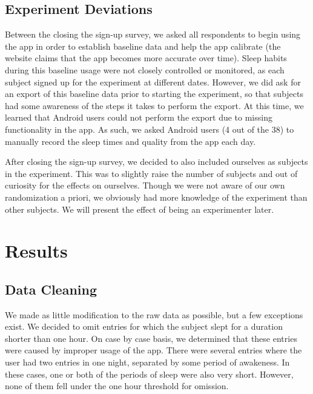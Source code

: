 \documentclass[12pt,]{article}
\begin{document}
\hypertarget{experiment-deviations}{%
\subsection{Experiment Deviations}\label{experiment-deviations}}

Between the closing the sign-up survey, we asked all respondents to
begin using the app in order to establish baseline data and help the app
calibrate (the website claims that the app becomes more accurate over
time). Sleep habits during this baseline usage were not closely
controlled or monitored, as each subject signed up for the experiment at
different dates. However, we did ask for an export of this baseline data
prior to starting the experiment, so that subjects had some awareness of
the steps it takes to perform the export. At this time, we learned that
Android users could not perform the export due to missing functionality
in the app. As such, we asked Android users (4 out of the 38) to
manually record the sleep times and quality from the app each day.

After closing the sign-up survey, we decided to also included ourselves
as subjects in the experiment. This was to slightly raise the number of
subjects and out of curiosity for the effects on ourselves. Though we
were not aware of our own randomization a priori, we obviously had more
knowledge of the experiment than other subjects. We will present the
effect of being an experimenter later.

\hypertarget{results}{%
\section{Results}\label{results}}

\hypertarget{data-cleaning}{%
\subsection{Data Cleaning}\label{data-cleaning}}

We made as little modification to the raw data as possible, but a few
exceptions exist. We decided to omit entries for which the subject slept
for a duration shorter than one hour. On case by case basis, we
determined that these entries were caused by improper usage of the app.
There were several entries where the user had two entries in one night,
separated by some period of awakeness. In these cases, one or both of
the periods of sleep were also very short. However, none of them fell
under the one hour threshold for omission.
\end{document}
